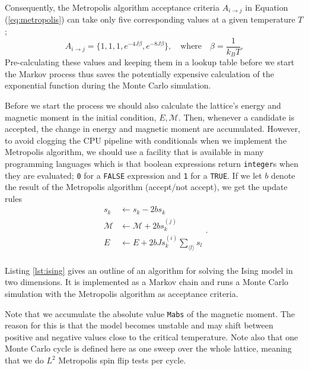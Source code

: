\documentclass[]{article}
\begin{document}
Consequently, the Metropolis algorithm acceptance criteria $A_{i \rightarrow j}$ in Equation (\ref{eq:metropolis}) can take only five corresponding values at a given temperature $T$;
\begin{equation} \label{eq:metropolis-acceptance}
	A_{i \rightarrow j} = \{ 1, 1, 1, e^{-4J \beta}, e^{-8J \beta} \}, \quad \text{where} \quad \beta = \frac{1}{k_BT}.
\end{equation}
Pre-calculating these values and keeping them in a lookup table before we start the Markov process thus saves the potentially expensive calculation of the exponential function during the Monte Carlo simulation.

Before we start the process we should also calculate the lattice's energy and magnetic moment in the initial condition, $E, \mathcal{M}$. Then, whenever a candidate is accepted, the change in energy and magnetic moment are accumulated. However, to avoid clogging the CPU pipeline with conditionals when we implement the Metropolis algorithm, we should use a facility that is available in many programming languages which is that boolean expressions return \lstinline|integer|s when they are evaluated; \lstinline|0| for a \lstinline|FALSE| expression and \lstinline|1| for a \lstinline|TRUE|. If we let $b$ denote the result of the Metropolis algorithm (accept/not accept), we get the update rules
\begin{equation}
\begin{aligned}
	s_k &\leftarrow s_k - 2bs_k \\
	\mathcal{M} &\leftarrow \mathcal{M} + 2bs_k^{(j)} \\
	E &\leftarrow E + 2bJ s_k^{(i)} \sum_{\langle l \rangle} s_l \\
\end{aligned}.
\end{equation}

\vspace{5mm}

Listing \ref{lst:ising} gives an outline of an algorithm for solving the Ising model in two dimensions. It is implemented as a Markov chain and runs a Monte Carlo simulation with the Metropolis algorithm as acceptance criteria. 

Note that we accumulate the absolute value \lstinline|Mabs| of the magnetic moment. The reason for this is that the model becomes unstable and may shift between positive and negative values close to the critical temperature. Note also that one Monte Carlo cycle is defined here as one sweep over the whole lattice, meaning that we do $L^2$ Metropolis spin flip tests per cycle. 
\end{document}
